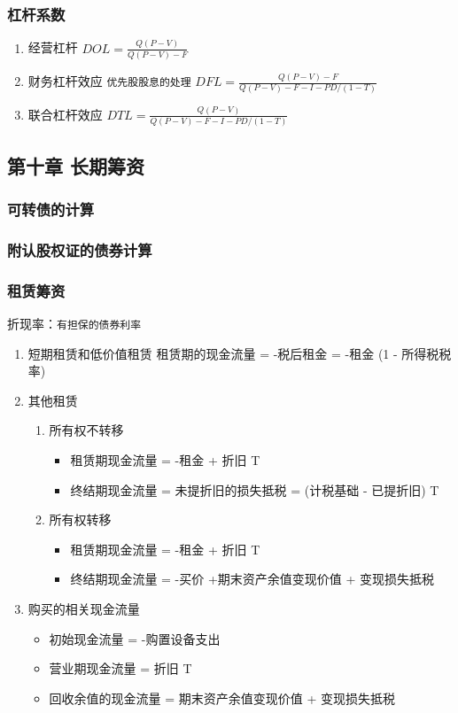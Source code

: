 \documentclass[12pt,a4paper]{article}
\begin{document}
\subsubsection{杠杆系数}
\label{sec:orgf6390ab}
\begin{enumerate}
\item 经营杠杆
\label{sec:org013f559}
\(DOL=\frac{Q(P-V)}{Q(P-V)-F}\)
\item 财务杠杆效应 \texttt{优先股股息的处理}
\label{sec:orgc80348e}
\(DFL=\frac{Q(P-V)-F}{Q(P-V)-F-I-PD/(1-T)}\)
\item 联合杠杆效应
\label{sec:orgb95970b}
\(DTL=\frac{Q(P-V)}{Q(P-V)-F-I-PD/(1-T)}\)
\end{enumerate}
\subsection{第十章 长期筹资}
\label{sec:org3610b8e}
\subsubsection{可转债的计算}
\label{sec:orgd84552d}
\subsubsection{附认股权证的债券计算}
\label{sec:org46cbbd6}
\subsubsection{租赁筹资}
\label{sec:org5fa2dfd}
折现率：\texttt{有担保的债券利率}
\begin{enumerate}
\item 短期租赁和低价值租赁
\label{sec:orgc7cb876}
租赁期的现金流量 = -税后租金 = -租金 \texttimes{} (1 - 所得税税率)
\item 其他租赁
\label{sec:org785c8c1}
\begin{enumerate}
\item 所有权不转移
\label{sec:org282964d}
\begin{itemize}
\item 租赁期现金流量 = -租金 + 折旧 \texttimes{} T
\item 终结期现金流量 = 未提折旧的损失抵税 = (计税基础 - 已提折旧) \texttimes{} T
\end{itemize}
\item 所有权转移
\label{sec:orgdab27c6}
\begin{itemize}
\item 租赁期现金流量 = -租金 + 折旧 \texttimes{} T
\item 终结期现金流量 = -买价 +期末资产余值变现价值 + 变现损失抵税
\end{itemize}
\end{enumerate}
\item 购买的相关现金流量
\label{sec:org4f71a0d}
\begin{itemize}
\item 初始现金流量 = -购置设备支出
\item 营业期现金流量 = 折旧 \texttimes{} T
\item 回收余值的现金流量 = 期末资产余值变现价值 + 变现损失抵税
\end{itemize}
\end{enumerate}
\end{document}
